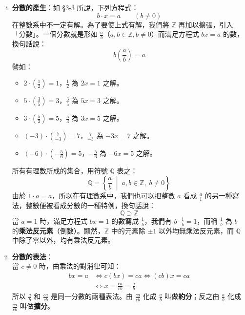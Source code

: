 \begin{enumerate}[(i)]
  \item \textbf{分數的產生}：如 \S 3-3 所說，下列方程式：
  \begin{equation}\label{eq:linear_eq_bx_a}
    b \cdot x = a \qquad (b \neq 0)
  \end{equation}
  在整數系中不一定有解。為了要使上式有解，我們將 $\mathbb{Z}$ 再加以擴張，引入「分數」。一個分數就是形如 $\frac{a}{b}$（$a, b \in \mathbb{Z}, b \neq 0$）而滿足方程式 $bx = a$ 的數，換句話說：
  \begin{equation*}
    b \left(\frac{a}{b}\right) = a
  \end{equation*}
  譬如：
  \begin{itemize}
    \item $2 \cdot (\frac{1}{2}) = 1$，$\frac{1}{2}$ 為 $2x = 1$ 之解。
    \item $5 \cdot (\frac{3}{5}) = 3$，$\frac{3}{5}$ 為 $5x = 3$ 之解。
    \item $3 \cdot (\frac{5}{3}) = 5$，$\frac{5}{3}$ 為 $3x = 5$ 之解。
    \item $(-3) \cdot (\frac{7}{-3}) = 7$，$\frac{7}{-3}$ 為 $-3x = 7$ 之解。
    \item $(-6) \cdot (-\frac{5}{6}) = 5$，$-\frac{5}{6}$ 為 $-6x = 5$ 之解。
  \end{itemize}
  所有有理數所成的集合，用符號 $\mathbb{Q}$ 表之：
  \begin{equation}\label{eq:rationals_set}
    \mathbb{Q} = \left\{\frac{a}{b} \;\middle|\; a, b \in \mathbb{Z}, \; b \neq 0\right\}
  \end{equation}
  由於 $1 \cdot a = a$，所以在有理數系中，我們也可以把整數 $a$ 看成 $\frac{a}{1}$ 的另一種寫法，整數便被看成分數的一種特例，換句話說：
  \begin{equation*}
    \mathbb{Q} \supset \mathbb{Z}
  \end{equation*}
  當 $a=1$ 時，滿足方程式 $bx = 1$ 的數寫成 $\frac{1}{b}$，我們有 $b \cdot \frac{1}{b} = 1$，而稱 $\frac{1}{b}$ 為 $b$ 的\textbf{乘法反元素}（倒數）。顯然，$\mathbb{Z}$ 中的元素除 $\pm 1$ 以外均無乘法反元素，而 $\mathbb{Q}$ 中除了零以外，均有乘法反元素。

  \item \textbf{分數的表法}：\\
  當 $c \neq 0$ 時，由乘法的對消律可知：
  \begin{align*}
    bx = a &\iff c(bx) = ca \iff (cb)x = ca \\
    &\iff x = \frac{ca}{cb} = \frac{a}{b}
  \end{align*}
  所以 $\frac{a}{b}$ 和 $\frac{ca}{cb}$ 是同一分數的兩種表法。由 $\frac{ca}{cb}$ 化成 $\frac{a}{b}$ 叫做\textbf{約分}；反之由 $\frac{a}{b}$ 化成 $\frac{ca}{cb}$ 叫做\textbf{擴分}。
  

\end{enumerate}
